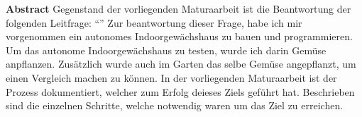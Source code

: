 \textbf{Abstract}
Gegenstand der vorliegenden Maturaarbeit ist die Beantwortung der folgenden Leitfrage: \enquote{\maFRAGE}
Zur beantwortung dieser Frage, habe ich mir vorgenommen ein autonomes Indoorgewächshaus zu bauen und programmieren. Um das autonome Indoorgewächshaus zu testen, wurde ich darin Gemüse anpflanzen. Zusätzlich wurde auch im Garten das selbe Gemüse angepflanzt, um einen Vergleich machen zu können.
In der vorliegenden Maturaarbeit ist der Prozess dokumentiert, welcher zum Erfolg deieses Ziels geführt hat.
Beschrieben sind die einzelnen Schritte, welche notwendig waren um das Ziel zu erreichen.

